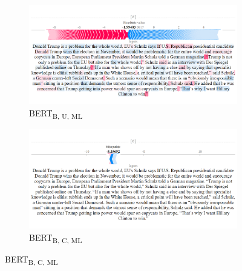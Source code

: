 \begin{figure}[!h]
    \begin{subfigure}[t]{0.35\textwidth}
        \includegraphics[width=\textwidth]{figs/news_T/bert-b-ml-u.png}
        \caption{{BERT}\textsubscript{B, U, ML}}
    \end{subfigure}
    \hspace{\fill} %
    \begin{subfigure}[t]{0.35\textwidth}
        \includegraphics[width=\linewidth]{figs/news_T/bert-b-ml-c.png}
        \caption{{BERT}\textsubscript{B, C, ML}}
    \end{subfigure}




\end{figure}
